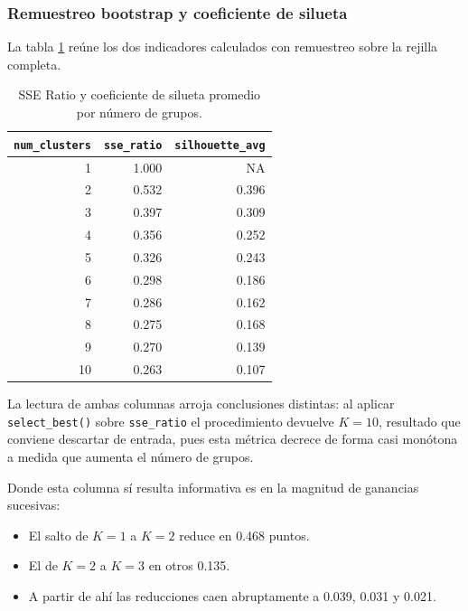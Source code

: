 \documentclass[
  10pt,
  a4paper]{article}
\providecommand{\tightlist}{%
  \setlength{\itemsep}{0pt}\setlength{\parskip}{0pt}}
\begin{document}
\subsubsection{Remuestreo bootstrap y coeficiente de silueta}\label{remuestreo-bootstrap-y-coeficiente-de-silueta}

La tabla \ref{tab:cuadro1} reúne los dos indicadores calculados con remuestreo sobre la rejilla completa.

\vspace{0.3cm}

\begin{table}[!h]
\centering
\caption{\label{tab:cuadro1}SSE Ratio y coeficiente de silueta promedio por número de grupos.}
\centering
\begin{tabular}[t]{rrr}
\toprule
\textbf{\texttt{num\_clusters}} & \textbf{\texttt{sse\_ratio}} & \textbf{\texttt{silhouette\_avg}}\\
\midrule
1 & 1.000 & NA\\
2 & 0.532 & 0.396\\
3 & 0.397 & 0.309\\
4 & 0.356 & 0.252\\
5 & 0.326 & 0.243\\
6 & 0.298 & 0.186\\
7 & 0.286 & 0.162\\
8 & 0.275 & 0.168\\
9 & 0.270 & 0.139\\
10 & 0.263 & 0.107\\
\bottomrule
\end{tabular}
\end{table}

\vspace{0.3cm}

La lectura de ambas columnas arroja conclusiones distintas: al aplicar \texttt{select\_best()} sobre \texttt{sse\_ratio} el procedimiento devuelve \(K = 10\), resultado que conviene descartar de entrada, pues esta métrica decrece de forma casi monótona a medida que aumenta el número de grupos.

Donde esta columna sí resulta informativa es en la magnitud de ganancias sucesivas:

\begin{itemize}
\tightlist
\item
  El salto de \(K = 1\) a \(K = 2\) reduce en 0.468 puntos.
\item
  El de \(K = 2\) a \(K = 3\) en otros 0.135.
\item
  A partir de ahí las reducciones caen abruptamente a 0.039, 0.031 y 0.021.
\end{itemize}
\end{document}
